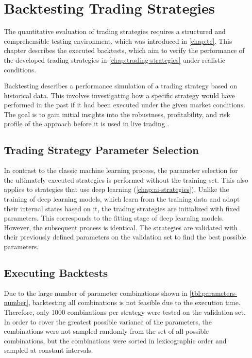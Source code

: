 \section{Backtesting Trading Strategies}
\label{chap:backtesting}

The quantitative evaluation of trading strategies requires a structured and comprehensible testing environment, which was introduced in \autoref{chap:te}.
This chapter describes the executed backtests, which aim to verify the performance of the developed trading strategies in \autoref{chap:trading-strategies} under realistic conditions.

Backtesting describes a performance simulation of a trading strategy based on historical data.
This involves investigating how a specific strategy would have performed in the past if it had been executed under the given market conditions.
The goal is to gain initial insights into the robustness, profitability, and risk profile of the approach before it is used in live trading \cite{backtesting}.

\subsection{Trading Strategy Parameter Selection}

In contrast to the classic machine learning process, the parameter selection for the ultimately executed strategies is performed without the training set.
This also applies to strategies that use deep learning (\autoref{chap:ai-strategies}).
Unlike the training of deep learning models, which learn from the training data and adapt their internal states based on it, the trading strategies are initialized with fixed parameters.
This corresponds to the fitting stage of deep learning models.
However, the subsequent process is identical.
The strategies are validated with their previously defined parameters on the validation set to find the best possible parameters.

\subsection{Executing Backtests}

Due to the large number of parameter combinations shown in \autoref{tbl:parameters-number}, backtesting all combinations is not feasible due to the execution time.
Therefore, only 1000 combinations per strategy were tested on the validation set.
In order to cover the greatest possible variance of the parameters, the combinations were not sampled randomly from the set of all possible combinations, but the combinations were sorted in lexicographic order and sampled at constant intervals.

